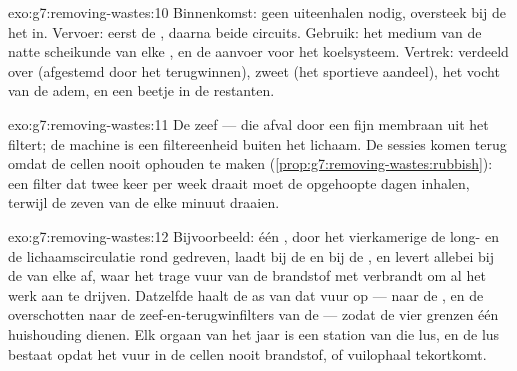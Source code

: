 \begin{solution}{exo:g7:removing-wastes:10}
Binnenkomst: geen uiteenhalen nodig, oversteek bij de  het
 in. Vervoer: eerst de , daarna beide circuits. Gebruik: het
medium van de natte scheikunde van elke , en de aanvoer voor het
koelsysteem. Vertrek: verdeeld over  (afgestemd door het
terugwinnen), zweet (het sportieve aandeel), het vocht van de adem, en
een beetje in de restanten.
\end{solution}

\begin{solution}{exo:g7:removing-wastes:11}
De zeef --- die afval door een fijn membraan uit het  filtert; de
machine is een filtereenheid buiten het lichaam. De sessies komen terug
omdat de cellen nooit ophouden  te maken
(\cref{prop:g7:removing-wastes:rubbish}): een filter dat twee keer per
week draait moet de opgehoopte dagen inhalen, terwijl de zeven van de
 elke minuut draaien.
\end{solution}

\begin{solution}{exo:g7:removing-wastes:12}
Bijvoorbeeld: één , door het vierkamerige  de long- en de
lichaamscirculatie rond gedreven, laadt  bij de  en
 bij de , en levert allebei bij de 
van elke  af, waar het trage vuur van de  brandstof met
 verbrandt om al het werk aan te drijven. Datzelfde  haalt de
as van dat vuur op ---  naar de ,  en de
overschotten naar de zeef-en-terugwinfilters van de  --- zodat de vier
grenzen één huishouding dienen. Elk orgaan van het jaar is een station van
die lus, en de lus bestaat opdat het vuur in de cellen nooit brandstof,
 of vuilophaal tekortkomt.
\end{solution}

